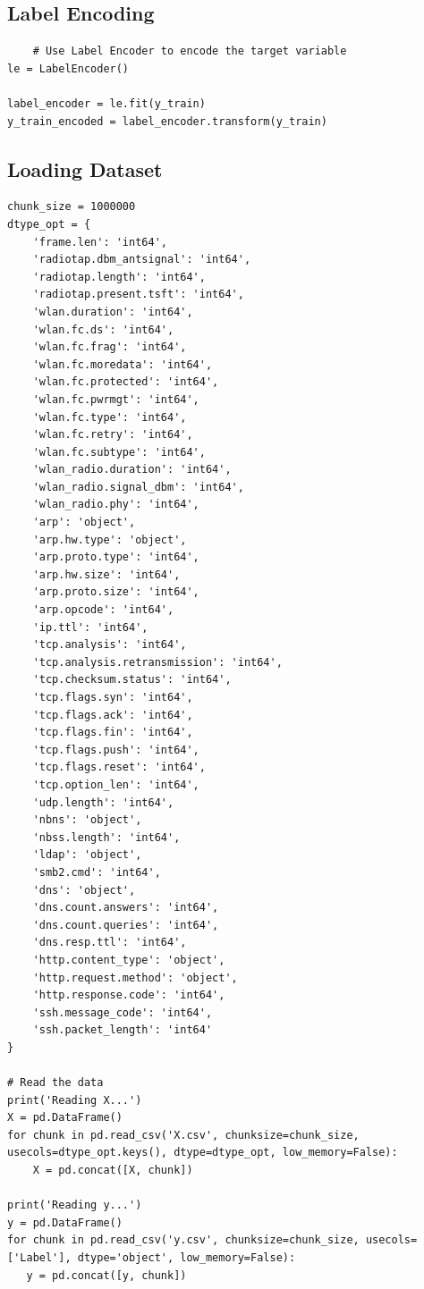 \begin{appendices}
\newpage
\subsection{Label Encoding}
\label{appx:Label Encoding}
\begin{lstlisting}
    # Use Label Encoder to encode the target variable
le = LabelEncoder()

label_encoder = le.fit(y_train)
y_train_encoded = label_encoder.transform(y_train)
\end{lstlisting}

\subsection{Loading Dataset}
\label{appx:Loading Dataset}
\begin{lstlisting}
chunk_size = 1000000
dtype_opt = {
    'frame.len': 'int64',
    'radiotap.dbm_antsignal': 'int64',
    'radiotap.length': 'int64',
    'radiotap.present.tsft': 'int64',
    'wlan.duration': 'int64',
    'wlan.fc.ds': 'int64',
    'wlan.fc.frag': 'int64',
    'wlan.fc.moredata': 'int64',
    'wlan.fc.protected': 'int64',
    'wlan.fc.pwrmgt': 'int64',
    'wlan.fc.type': 'int64',
    'wlan.fc.retry': 'int64',
    'wlan.fc.subtype': 'int64',
    'wlan_radio.duration': 'int64',
    'wlan_radio.signal_dbm': 'int64',
    'wlan_radio.phy': 'int64',
    'arp': 'object',
    'arp.hw.type': 'object',
    'arp.proto.type': 'int64',
    'arp.hw.size': 'int64',
    'arp.proto.size': 'int64',
    'arp.opcode': 'int64',
    'ip.ttl': 'int64',
    'tcp.analysis': 'int64',
    'tcp.analysis.retransmission': 'int64',
    'tcp.checksum.status': 'int64',
    'tcp.flags.syn': 'int64',
    'tcp.flags.ack': 'int64',
    'tcp.flags.fin': 'int64',
    'tcp.flags.push': 'int64',
    'tcp.flags.reset': 'int64',
    'tcp.option_len': 'int64',
    'udp.length': 'int64',
    'nbns': 'object',
    'nbss.length': 'int64',
    'ldap': 'object',
    'smb2.cmd': 'int64',
    'dns': 'object',
    'dns.count.answers': 'int64',
    'dns.count.queries': 'int64',
    'dns.resp.ttl': 'int64',
    'http.content_type': 'object',
    'http.request.method': 'object',
    'http.response.code': 'int64',
    'ssh.message_code': 'int64',
    'ssh.packet_length': 'int64'
}

# Read the data
print('Reading X...')
X = pd.DataFrame()
for chunk in pd.read_csv('X.csv', chunksize=chunk_size, usecols=dtype_opt.keys(), dtype=dtype_opt, low_memory=False):
    X = pd.concat([X, chunk])

print('Reading y...')
y = pd.DataFrame()
for chunk in pd.read_csv('y.csv', chunksize=chunk_size, usecols=['Label'], dtype='object', low_memory=False):
   y = pd.concat([y, chunk])


\end{lstlisting}
\end{appendices}
